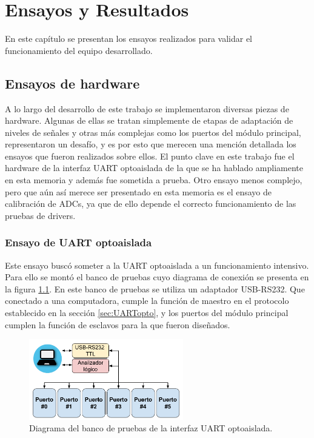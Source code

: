 
\chapter{Ensayos y Resultados} %

\label{Chapter4} %

En este capítulo se presentan los ensayos realizados para validar el funcionamiento del equipo desarrollado.

\section{Ensayos de hardware}
\label{sec:pruebasHW}

A lo largo del desarrollo de este trabajo se implementaron diversas piezas de hardware. Algunas de ellas se tratan simplemente de etapas de adaptación de niveles de señales y otras más complejas como los puertos del módulo principal, representaron un desafío, y es por esto que merecen una mención detallada los ensayos que fueron realizados sobre ellos. El punto clave en este trabajo fue el hardware de la interfaz UART optoaislada de la que se ha hablado ampliamente en esta memoria y además fue sometida a prueba. Otro ensayo menos complejo, pero que aún así merece ser presentado en esta memoria es el ensayo de calibración de ADCs, ya que de ello depende el correcto funcionamiento de las pruebas de drivers.

\subsection{Ensayo de UART optoaislada}

Este ensayo buscó someter a la UART optoaislada a un funcionamiento intensivo. Para ello se montó el banco de pruebas cuyo diagrama de conexión se presenta en la figura \ref{fig:BancoPruebaUart}. En este banco de pruebas se utiliza un adaptador USB-RS232. Que conectado a una computadora, cumple la función de maestro en el protocolo establecido en la sección \ref{sec:UARTopto}, y los puertos del módulo principal cumplen la función de esclavos para la que fueron diseñados.

\begin{figure}[H]
	\centering
	\includegraphics[width=0.6\textwidth]{./Figures/BancoPruebaUart.pdf}
	\caption{Diagrama del banco de pruebas de la interfaz UART optoaislada.}
	\label{fig:BancoPruebaUart}
\end{figure}

